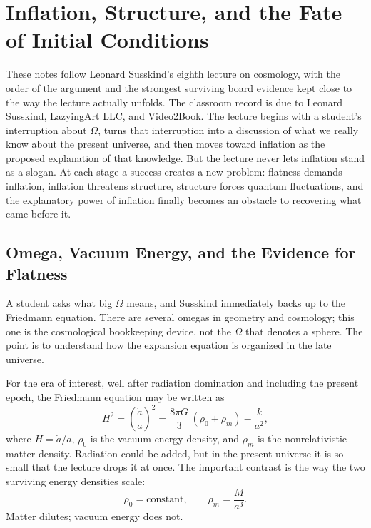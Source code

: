 \chapter{Inflation, Structure, and the Fate of Initial Conditions}

These notes follow Leonard Susskind's eighth lecture on cosmology, with the order of the argument and the strongest surviving board evidence kept close to the way the lecture actually unfolds. The classroom record is due to Leonard Susskind, LazyingArt LLC, and Video2Book. The lecture begins with a student's interruption about \(\Omega\), turns that interruption into a discussion of what we really know about the present universe, and then moves toward inflation as the proposed explanation of that knowledge. But the lecture never lets inflation stand as a slogan. At each stage a success creates a new problem: flatness demands inflation, inflation threatens structure, structure forces quantum fluctuations, and the explanatory power of inflation finally becomes an obstacle to recovering what came before it.

\section{Omega, Vacuum Energy, and the Evidence for Flatness}

A student asks what big \(\Omega\) means, and Susskind immediately backs up to the Friedmann equation. There are several omegas in geometry and cosmology; this one is the cosmological bookkeeping device, not the \(\Omega\) that denotes a sphere. The point is to understand how the expansion equation is organized in the late universe.

For the era of interest, well after radiation domination and including the present epoch, the Friedmann equation may be written as
\begin{equation}
H^2=\left(\frac{\dot a}{a}\right)^2=\frac{8\pi G}{3}\,(\rho_0+\rho_m)-\frac{k}{a^2},
\end{equation}
where \(H=\dot a/a\), \(\rho_0\) is the vacuum-energy density, and \(\rho_m\) is the nonrelativistic matter density. Radiation could be added, but in the present universe it is so small that the lecture drops it at once. The important contrast is the way the two surviving energy densities scale:
\begin{equation}
\rho_0=\text{constant},
\qquad
\rho_m=\frac{M}{a^3}.
\end{equation}
Matter dilutes; vacuum energy does not.

